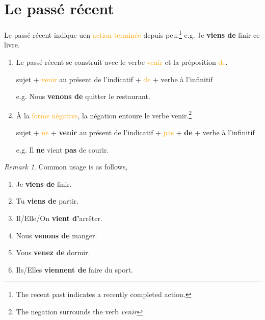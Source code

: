 \documentclass[math,code]{amznotes}
\theoremstyle{remark}
\newtheorem*{remark}{Remark}
\begin{document}
\section{Le passé récent}
Le passé récent indique uen \textcolor{orange}{action terminée} depuis peu.\footnote{The recent past indicates a recently completed action.} \newline
e.g. Je \textbf{viens de} finir ce livre.
\begin{enumerate}
    \item Le passé récent se construit avec le verbe \textcolor{orange}{venir} et la préposition \textcolor{orange}{de}.
    \begin{center}
        sujet + \textcolor{orange}{venir} au présent de l'indicatif + \textcolor{orange}{de} + verbe à l'infinitif
    \end{center}
    e.g. Nous \textbf{venons de} quitter le restaurant.
    \item À la \textcolor{orange}{forme négative}, la négation entoure le verbe venir.\footnote{The negation surrounds the verb \textit{venir}}
    \begin{center}
        sujet + \textcolor{orange}{ne} + \textbf{venir} au présent de l'indicatif + \textcolor{orange}{pas} + \textbf{de} + verbe à l'infinitif
    \end{center}
    e.g. Il \textbf{ne} vient \textbf{pas} de courir.
\end{enumerate}
\begin{notebox}
    \begin{remark}
        Common usage is as follows,
        \begin{enumerate}
            \item Je \textbf{viens de} finir.
            \item Tu \textbf{viens de} partir.
            \item Il/Elle/On \textbf{vient d'}arrêter.
            \item Nous \textbf{venons de} manger.
            \item Vous \textbf{venez de} dormir.
            \item Ils/Elles \textbf{viennent de} faire du sport.
        \end{enumerate}
    \end{remark}
\end{notebox}
\end{document}
